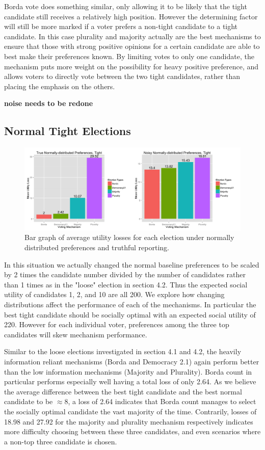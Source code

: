 \documentclass[11pt]{scrartcl}
\begin{document}
Borda vote does something similar, only allowing it to be likely that the tight candidate still receives a relatively high position. However the determining factor will still be more marked if a voter prefers a non-tight candidate to a tight candidate. In this case plurality and majority actually are the best mechanisms to ensure that those with strong positive opinions for a certain candidate are able to best make their preferences known. By limiting votes to only one candidate, the mechanism puts more weight on the possibility for heavy positive preference, and allows voters to directly vote between the two tight candidates, rather than placing the emphasis on the others.


\textbf{noise needs to be redone}


\subsection{Normal Tight Elections}

\begin{figure}[H]\center
\includegraphics[scale=0.38]{normal_tight.png}
\caption{Bar graph of average utility losses for each election under normally distributed preferences and truthful reporting.}
\end{figure}

In this situation we actually changed the normal baseline preferences to be scaled by 2 times the candidate number divided by the number of candidates rather than 1 times as in the "loose" election in section 4.2. Thus the expected social utility of candidates 1, 2, and 10 are all 200. We explore how changing distributions affect the performance of each of the mechanisms. In particular the best tight candidate should be socially optimal with an expected social utility of 220. However for each individual voter, preferences among the three top candidates will skew mechanism performance.

Similar to the loose elections investigated in section 4.1 and 4.2, the heavily information reliant mechanisms (Borda and Democracy 2.1) again perform better than the low information mechanisms (Majority and Plurality). Borda count in particular performs especially well having a total loss of only 2.64. As we believe the average difference between the best tight candidate and the best normal candidate to be $\approx 8$, a loss of 2.64 indicates that Borda count manages to select the socially optimal candidate the vast majority of the time. Contrarily, losses of 18.98 and 27.92 for the majority and plurality mechanism respectively indicates more difficulty choosing between these three candidates, and even scenarios where a non-top three candidate is chosen.
\end{document}
